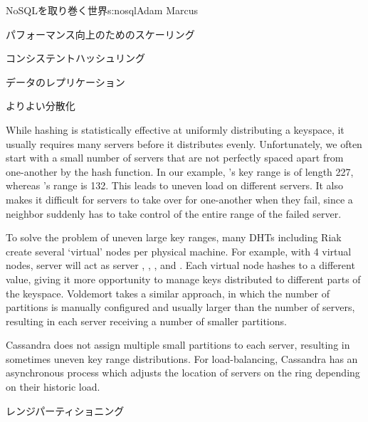 \begin{aosachapter}{NoSQLを取り巻く世界}{s:nosql}{Adam Marcus}
\begin{aosasect1}{パフォーマンス向上のためのスケーリング}
\begin{aosasect2}{コンシステントハッシュリング}
\begin{aosasect3}{データのレプリケーション}
\end{aosasect3}

\begin{aosasect3}{よりよい分散化}

While hashing is statistically effective at uniformly distributing a
keyspace, it usually requires many servers before it distributes
evenly.  Unfortunately, we often start with a small number of servers
that are not perfectly spaced apart from one-another by the hash
function.  In our example, 's key range is of length 227,
whereas 's range is 132.  This leads to uneven load on
different servers.  It also makes it difficult for servers to take
over for one-another when they fail, since a neighbor suddenly has to
take control of the entire range of the failed server.

To solve the problem of uneven large key ranges, many DHTs including
Riak create several `virtual' nodes per physical machine.  For
example, with 4 virtual nodes, server  will act as server
, , , and .  Each virtual
node hashes to a different value, giving it more opportunity to manage
keys distributed to different parts of the keyspace.  Voldemort takes
a similar approach, in which the number of partitions is manually
configured and usually larger than the number of servers, resulting in
each server receiving a number of smaller partitions.

Cassandra does not assign multiple small partitions to each server,
resulting in sometimes uneven key range distributions.  For
load-balancing, Cassandra has an asynchronous process which adjusts
the location of servers on the ring depending on their historic load.

\end{aosasect3}

\end{aosasect2}

\vspace{-0.2cm} %
\begin{aosasect2}{レンジパーティショニング}
\vspace{-0.1cm} %


\end{aosasect2}
\end{aosasect1}
\end{aosachapter}
